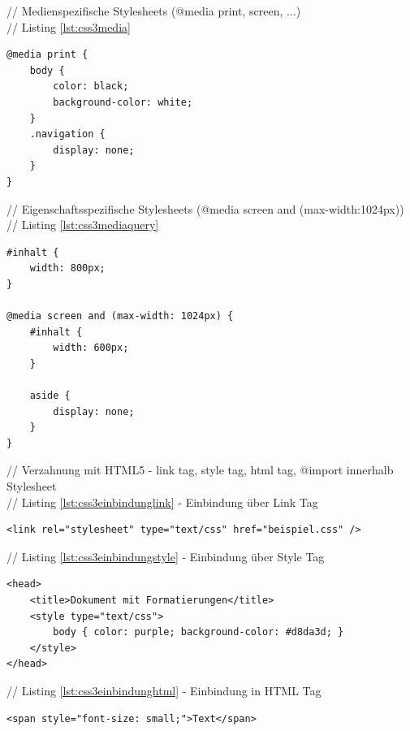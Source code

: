 \documentclass[12pt,a4paper,bibliography=totocnumbered,listof=totocnumbered]{scrartcl}
\begin{document}
// Medienspezifische Stylesheets (@media print, screen, ...)\\
// Listing \ref{lst:css3media}
	\vspace{1em}
	\begin{lstlisting}[caption=CSS3 medienspezifisches Stylesheet, label=lst:css3media]
@media print {
	body {
		color: black;
		background-color: white;
	}
	.navigation {
		display: none;
	}
}
	\end{lstlisting}

// Eigenschaftsspezifische Stylesheets (@media screen and (max-width:1024px))\\
// Listing \ref{lst:css3mediaquery}
	\vspace{1em}
	\begin{lstlisting}[caption=CSS3 eigenschaftsspezifisches Stylesheet, label=lst:css3mediaquery]
#inhalt {
	width: 800px;
}
 
@media screen and (max-width: 1024px) {
	#inhalt {
		width: 600px;
	}
 
	aside {
		display: none;
	}
}
	\end{lstlisting}
	
// Verzahnung mit HTML5 - link tag, style tag, html tag, @import innerhalb Stylesheet\\
// Listing \ref{lst:css3einbindunglink} - Einbindung über Link Tag
	\vspace{1em}
	\begin{lstlisting}[caption=Stylesheet Einbindung über Link Tag, label=lst:css3einbindunglink]
<link rel="stylesheet" type="text/css" href="beispiel.css" />
	\end{lstlisting}
	
// Listing \ref{lst:css3einbindungstyle} - Einbindung über Style Tag
	\vspace{1em}
	\begin{lstlisting}[caption=Stylesheet Einbindung über Style Tag, label=lst:css3einbindungstyle]
<head>
	<title>Dokument mit Formatierungen</title>
	<style type="text/css">
		body { color: purple; background-color: #d8da3d; }
	</style>
</head>
	\end{lstlisting}
	
// Listing \ref{lst:css3einbindunghtml} - Einbindung in HTML Tag
	\vspace{1em}
	\begin{lstlisting}[caption=Stylesheet Einbindung in HTML Tag, label=lst:css3einbindunghtml]
<span style="font-size: small;">Text</span>
	\end{lstlisting}
\end{document}
